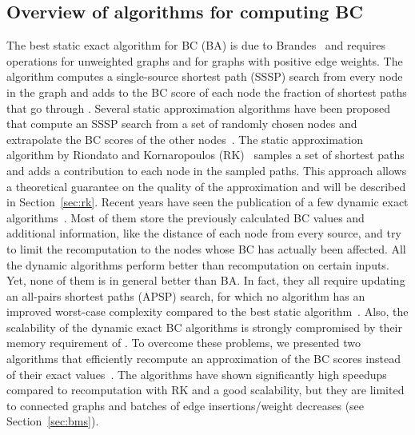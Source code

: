 \documentclass[english]{llncs}
\newcommand{\rk}{\textsf{RK}\xspace}
\begin{document}
\subsection{Overview of algorithms for computing BC}
The best static exact algorithm for BC (\textsf{BA}) is due to Brandes~\cite{Brandes01betweennessCentrality} and requires  operations for unweighted graphs
and  for graphs with positive edge weights. The algorithm computes a single-source shortest path (SSSP) search from every node  in the graph and adds to the BC score of each node  the fraction of shortest paths that go through . Several static approximation algorithms have been proposed that compute an SSSP search from a set of randomly chosen nodes and extrapolate the BC scores of the other nodes~\cite{DBLP:journals/ijbc/BrandesP07,DBLP:conf/alenex/GeisbergerSS08,DBLP:conf/waw/BaderKMM07}. The static approximation algorithm by Riondato and Kornaropoulos (\rk)~\cite{DBLP:conf/wsdm/RiondatoK14} samples a set of shortest paths and adds a contribution to each node in the sampled paths. This approach allows a theoretical guarantee on the quality of the approximation and will be described in Section~\ref{sec:rk}.
Recent years have seen the publication of a few dynamic exact algorithms~\cite{DBLP:conf/www/LeeLPCC12,DBLP:conf/socialcom/GreenMB12,kourtellis2014scalable,DBLP:journals/snam/KasCC14,DBLP:conf/mfcs/NasrePR14,DBLP:conf/waw/GoelSIS13}. Most of them
store the previously calculated BC values and additional information, like the distance
of each node from every source, and try to limit the recomputation to the nodes whose
BC has actually been affected. All the dynamic algorithms perform better than
recomputation on certain inputs. Yet, none of them
is in general better than \textsf{BA}. In fact, they
all require updating an all-pairs shortest paths (APSP) search, for which no algorithm has an improved worst-case complexity compared to the best static algorithm~\cite{DBLP:journals/algorithmica/RodittyZ11}. 
Also, the scalability of the dynamic exact BC algorithms is strongly compromised by their memory requirement of . To overcome these problems, we presented two algorithms that efficiently recompute an approximation of the BC scores instead of their exact values~\cite{DBLP:conf/alenex/BergaminiMS15}. 
The algorithms have shown significantly high speedups compared to recomputation with \rk and a good scalability, but they are limited to connected graphs and batches of edge insertions/weight decreases (see Section~\ref{sec:bms}).
\end{document}
